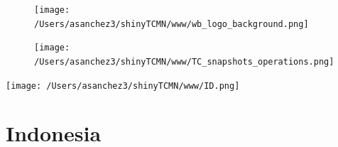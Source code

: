 \documentclass{article}\usepackage[]{graphicx}\usepackage[]{color}
\begin{document}
\newpage

\begin{figure}
  \vspace{-3ex} %
  \hspace{-7ex} %
  \texttt{[image: /Users/asanchez3/shinyTCMN/www/wb\_logo\_background.png]}
\end{figure}
\begin{figure}
  \begin{minipage}[t]{0.99\textwidth} %
      \vspace{-30ex}
      \hspace{-2ex}
      \raggedright{\texttt{[image: /Users/asanchez3/shinyTCMN/www/TC\_snapshots\_operations.png]}}
  \end{minipage}
\end{figure}
%
\begin{minipage}[t]{0.99\textwidth} %
  \vspace{-1.5cm}
  \begin{minipage}[c]{0.36\textwidth} 
    \begin{minipage}[c]{0.28\textwidth} %
      \texttt{[image: /Users/asanchez3/shinyTCMN/www/ID.png]}
    \end{minipage}
    \begin{minipage}[c]{0.70\textwidth} %
      \section*{\color{blue!40!black}Indonesia}
    \end{minipage}
  \end{minipage}
  \begin{minipage}[c]{0.63\textwidth}
  \end{minipage}  
\end{minipage} %
\end{document}
